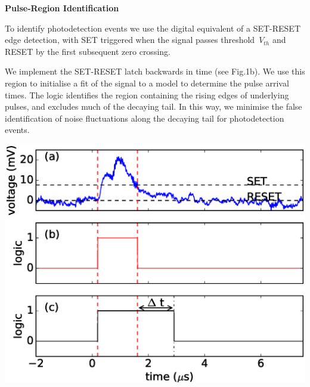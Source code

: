
\begin{center}
  \begin{center} {\bf \Large \textsf {Pulse-Region Identification}}\end{center}
\end{center}

To identify
photodetection events
we use
the digital equivalent of a SET-RESET edge detection,
with SET triggered when the signal passes threshold~$V_{th}$
and RESET by the first subsequent zero crossing.

We implement the SET-RESET latch backwards in time (see Fig.1b).
We use this region to initialise a fit of the signal to a model to determine the pulse arrival times. 
The logic identifies the region containing the rising edges of underlying pulses,
and excludes much of the decaying tail.
In this way, we minimise the false identification of noise fluctuations along the decaying tail for photodetection events.
\begin{figurehere}
  \begin{center}
    \includegraphics[width=1\linewidth]{figures/comparator/comparator_at_500ns.eps}
  \end{center}
  \vspace{-0.8cm}
\end{figurehere}

